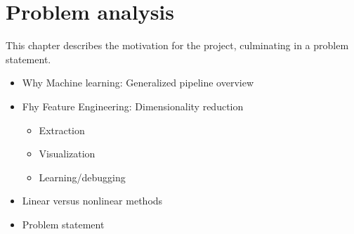 \chapter{Problem analysis}\label{cha:problem-analysis}
This chapter describes the motivation for the project, culminating in a problem statement.



\begin{itemize}
    \item Why Machine learning: Generalized pipeline overview
    \item Fhy Feature Engineering: Dimensionality reduction
          \begin{itemize}
              \item Extraction
              \item Visualization
              \item Learning/debugging
          \end{itemize}
    \item Linear versus nonlinear methods
    \item Problem statement
\end{itemize}






